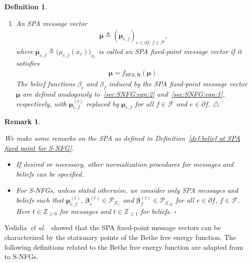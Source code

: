 \documentclass[journal]{IEEEtran}
\newcommand{\add}[1]{{\color{black}#1}}
\newtheorem{remark}[theorem]{Remark}
\newtheorem{definition}[theorem]{Definition}
\newcommand{\manualendsymbol}[1]{%
  \leavevmode\unskip\penalty9999\hbox{}\nobreak\hfill
  \quad\hbox{#1}}
\newcommand{\edefinition}{\manualendsymbol{\ensuremath{\triangle}}}
\newcommand{\eassumption}{\manualendsymbol{\ensuremath{\square}}}
\newcommand{\vect}[1]{ \bm{#1} }
\newcommand{\set}[1]{\mathcal{#1}}
\newcommand{\beli}{\beta}
\newcommand{\vbeli}{ \vect{\beli} }
\newcommand{\setF}{ \mathcal{F} }
\newcommand{\setpf}{ \partial f }
\newcommand{\xe}{ x_{e} }
\newcommand{\setxe}{ \mathcal{X}_{e} }
\newcommand{\setxf}{ \mathcal{X}_{\setpf} }
\newcommand{\vmu}{ \vect{ \mu } }
\newcommand{\defeq}{ \triangleq }
\newcommand{\sZp}{ \mathbb{Z}_{\geq 0} }
\newcommand{\sZpp}{ \mathbb{Z}_{\geq 1} }
\newcommand{\etof}{ e,f }
\newcommand{\fSPAN}{ f_{\mathrm{SPA},\mathsf{N}} }
\newcommand*{\etal}{\textit{et al.}}
\newcommand{\pmf}[1]{ \set{P}_{#1} }
\begin{document}
\begin{definition}
\begin{enumerate}
    \item An SPA message vector
          \begin{align}
            \vmu \defeq ( \vmu_{\etof} )_{e \in \setpf,\, f \in \setF},
            \label{sec:SNFG:eqn:10}
          \end{align}
          where
          $ \vmu_{\etof} \defeq \bigl( \mu_{\etof}(\xe) \bigr)_{ \! \xe} $
          is called an SPA fixed-point message vector if it satisfies
          \begin{align}
            \vmu = \fSPAN(\vmu). \label{sec:SNFG:eqn:11}
          \end{align}
          \add{The belief functions} $ \beli_e $ and $ \beli_f $
          \add{induced by} the SPA fixed-point message vector $ \vmu $
          \add{are defined analogously to}~\eqref{sec:SNFG:eqn:2}
          and~\eqref{sec:SNFG:eqn:1}, respectively, with
          $ \vmu_{\etof}^{(t)} $ replaced by $ \vmu_{\etof} $ for all
          $ f \in \setF $ and $ e \in \setpf $.\edefinition

  \end{enumerate}
\end{definition}

\begin{remark}
  \label{asmp: assume messages are nonnegative}

  We make some remarks on the SPA as defined in
  Definition~\ref{def:belief at SPA fixed point for S-NFG}.
  \begin{itemize}
    \item If desired or necessary, other normalization procedures for messages and
          beliefs can be specified.

    \item \add{For S-NFGs, unless stated otherwise, we consider only SPA
            messages and beliefs such that
            $ \vmu_{\etof}^{(t)}, \ \vbeli_{e}^{(t)} \in \pmf{\setxe}$ and
            $ \vbeli_f^{(t)} \in \pmf{\setxf} $ for all $e \in \setpf$,
            $f \in \setF$. Here $ t \in \sZp $ for messages and
            $ t \in \sZpp $ for beliefs.}\eassumption
  \end{itemize}

\end{remark}

Yedidia~\etal~\cite[Section V]{Yedidia2005} showed that the SPA fixed-point
message vectors can be characterized by the stationary points of the Bethe
free energy function.  The following definitions related to the Bethe free
energy function are adapted from~\cite[Section V]{Yedidia2005} to S-NFGs.
\end{document}
